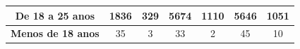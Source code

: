 \begin{table}[H]
{\begin{tabular}{c|cc|cc|cc|}
\multicolumn{1}{|c|}{\cellcolor[HTML]{C0C0C0}\textbf{De 18 a 25 anos}}  & \multicolumn{1}{c|}{1836}                                    & 329                                       & \multicolumn{1}{c|}{5674}                                    & 1110                                      & \multicolumn{1}{c|}{5646}                                    & 1051                                      \\ \hline
\multicolumn{1}{|c|}{\cellcolor[HTML]{C0C0C0}\textbf{Menos de 18 anos}} & \multicolumn{1}{c|}{35}                                      & 3                                         & \multicolumn{1}{c|}{33}                                      & 2                                         & \multicolumn{1}{c|}{45}                                      & 10                                        \\ \hline
\end{tabular}%
}
\end{table}

